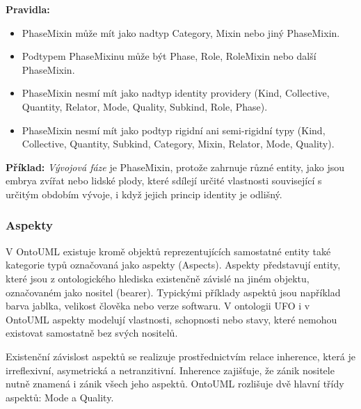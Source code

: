\begin{itemize}
  \textbf{Pravidla:}
  \begin{itemize}
    \item PhaseMixin může mít jako nadtyp Category, Mixin nebo jiný PhaseMixin.
    \item Podtypem PhaseMixinu může být Phase, Role, RoleMixin nebo další PhaseMixin.
    \item PhaseMixin nesmí mít jako nadtyp identity providery (Kind, Collective, Quantity, Relator, Mode, Quality, Subkind, Role, Phase).
    \item PhaseMixin nesmí mít jako podtyp rigidní ani semi-rigidní typy (Kind, Collective, Quantity, Subkind, Category, Mixin, Relator, Mode, Quality). \cite{ontouml_class_stereotypes}
  \end{itemize}

  \textbf{Příklad:} \textit{Vývojová fáze} je PhaseMixin, protože zahrnuje různé entity, jako jsou embrya zvířat nebo lidské plody, které sdílejí určité vlastnosti související s určitým obdobím vývoje, i když jejich princip identity je odlišný.

\end{itemize}

\subsubsection{Aspekty}
V OntoUML existuje kromě objektů reprezentujících samostatné entity také kategorie typů označovaná jako aspekty (Aspects). Aspekty představují entity, které jsou z ontologického hlediska existenčně závislé na jiném objektu, označovaném jako nositel (bearer). Typickými příklady aspektů jsou například barva jablka, velikost člověka nebo verze softwaru. V ontologii UFO i v OntoUML aspekty modelují vlastnosti, schopnosti nebo stavy, které nemohou existovat samostatně bez svých nositelů.

Existenční závislost aspektů se realizuje prostřednictvím relace inherence, která je irreflexivní, asymetrická a netranzitivní. Inherence zajišťuje, že zánik nositele nutně znamená i zánik všech jeho aspektů. OntoUML rozlišuje dvě hlavní třídy aspektů: Mode a Quality. \cite{KOM_prezentace4, Pergl2018}
 
